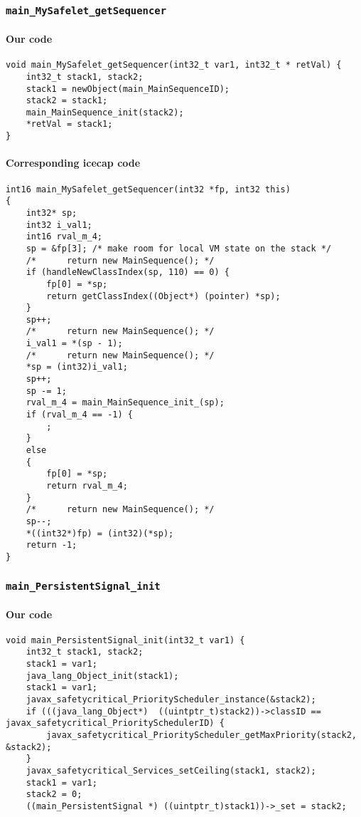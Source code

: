 \begin{landscape}
\begin{multicols}{2}
\subsubsection{\texttt{main\_MySafelet\_getSequencer}}

\paragraph{Our code}\hfill
\begin{lstlisting}[firstnumber=1618]
void main_MySafelet_getSequencer(int32_t var1, int32_t * retVal) {
	int32_t stack1, stack2;
	stack1 = newObject(main_MainSequenceID);
	stack2 = stack1;
	main_MainSequence_init(stack2);
	*retVal = stack1;
}
\end{lstlisting}

\paragraph{Corresponding icecap code}\hfill
\begin{lstlisting}[firstnumber=54461]
int16 main_MySafelet_getSequencer(int32 *fp, int32 this)
{
	int32* sp;
	int32 i_val1;
	int16 rval_m_4;
	sp = &fp[3]; /* make room for local VM state on the stack */
	/*		return new MainSequence(); */
	if (handleNewClassIndex(sp, 110) == 0) {
		fp[0] = *sp;
		return getClassIndex((Object*) (pointer) *sp);
	}
	sp++;
	/*		return new MainSequence(); */
	i_val1 = *(sp - 1);
	/*		return new MainSequence(); */
	*sp = (int32)i_val1;
	sp++;
	sp -= 1;
	rval_m_4 = main_MainSequence_init_(sp);
	if (rval_m_4 == -1) {
		;
	}
	else
	{
		fp[0] = *sp;
		return rval_m_4;
	}
	/*		return new MainSequence(); */
	sp--;
	*((int32*)fp) = (int32)(*sp);
	return -1;
}
\end{lstlisting}

\subsubsection{\texttt{main\_PersistentSignal\_init}}

\paragraph{Our code}\hfill
\begin{lstlisting}[firstnumber=1657]
void main_PersistentSignal_init(int32_t var1) {
	int32_t stack1, stack2;
	stack1 = var1;
	java_lang_Object_init(stack1);
	stack1 = var1;
	javax_safetycritical_PriorityScheduler_instance(&stack2);
	if (((java_lang_Object*)  ((uintptr_t)stack2))->classID == javax_safetycritical_PrioritySchedulerID) {
		javax_safetycritical_PriorityScheduler_getMaxPriority(stack2, &stack2);
	}
	javax_safetycritical_Services_setCeiling(stack1, stack2);
	stack1 = var1;
	stack2 = 0;
	((main_PersistentSignal *) ((uintptr_t)stack1))->_set = stack2;


\end{lstlisting}
\end{multicols}
\end{landscape}
